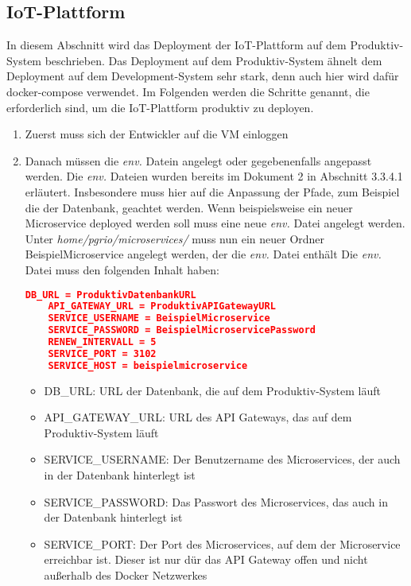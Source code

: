 \subsection{IoT-Plattform}
In diesem Abschnitt wird das Deployment der IoT-Plattform auf dem Produktiv-System beschrieben. 
Das Deployment auf dem Produktiv-System ähnelt dem Deployment auf dem Development-System sehr stark, denn auch hier wird dafür docker-compose verwendet. 
Im Folgenden werden die Schritte genannt, die erforderlich sind, um die IoT-Plattform produktiv zu deployen. \newline
\begin{enumerate}
	\item Zuerst muss sich der Entwickler auf die VM einloggen
	\item Danach müssen die \textit{env.} Datein angelegt oder gegebenenfalls angepasst werden. Die \textit{env.} Dateien wurden bereits im Dokument 2 in Abschnitt 3.3.4.1 erläutert. Insbesondere muss hier auf die Anpassung der Pfade, zum Beispiel die der Datenbank, geachtet werden. \newline
	Wenn beispielsweise ein neuer Microservice deployed werden soll muss eine neue \textit{env.} Datei angelegt werden. Unter \textit{home/pgrio/microservices/} muss nun ein neuer Ordner BeispielMicroservice angelegt werden, der die \textit{env.} Datei enthält \newline
	Die \textit{env.} Datei muss den folgenden Inhalt haben: \newline
	\begin{lstlisting}[language=json,firstnumber=1,basicstyle=\footnotesize]
	DB_URL = ProduktivDatenbankURL
	API_GATEWAY_URL = ProduktivAPIGatewayURL
	SERVICE_USERNAME = BeispielMicroservice
	SERVICE_PASSWORD = BeispielMicroservicePassword
	RENEW_INTERVALL = 5
	SERVICE_PORT = 3102
	SERVICE_HOST = beispielmicroservice
	\end{lstlisting}
	\begin{itemize}
		\item DB\_URL: URL der Datenbank, die auf dem Produktiv-System läuft
		\item API\_GATEWAY\_URL: URL des API Gateways, das auf dem Produktiv-System läuft
		\item SERVICE\_USERNAME: Der Benutzername des Microservices, der auch in der Datenbank hinterlegt ist
		\item SERVICE\_PASSWORD: Das Passwort des Microservices, das auch in der Datenbank hinterlegt ist
		\item SERVICE\_PORT: Der Port des Microservices, auf dem der Microservice erreichbar ist. Dieser ist nur dür das API Gateway offen und nicht außerhalb des Docker Netzwerkes

\end{itemize}
\end{enumerate}
